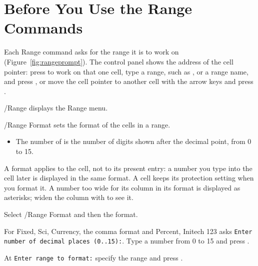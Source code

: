 \section{Before You Use the Range Commands}
Each Range command asks for the range it is to work on
(Figure~\ref{fig:rangeprompt}).  The control panel shows the address of the
cell pointer: press  to work on that one cell, type a range,
such as , or a range name, and press , or move the
cell pointer to another cell with the arrow keys and press .

/Range displays the Range menu.

/Range Format sets the format of the cells in a range.

\begin{itemize}
\item The number of  is the number of digits shown
  after the decimal point, from 0 to 15.
\end{itemize}
A format applies to the cell, not to its present entry: a number you type
into the cell later is displayed in the same format.  A cell keeps its
protection setting when you format it.  A number too wide for its column in
its format is displayed as asterisks; widen the column with
 to see it.

\begin{Steps123}
\item Select /Range Format and then the format.
\item For Fixed, Sci, Currency, the comma format and Percent, Initech 123
  asks \texttt{Enter number of decimal places (0..15):}.  Type a number from
  0 to 15 and press .
\item At \texttt{Enter range to format:} specify the range and press
  .
\end{Steps123}

